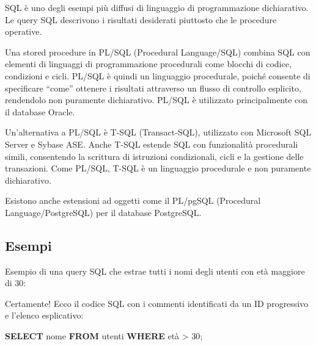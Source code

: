 \documentclass[
  letterpaper,
]{scrbook}
\newenvironment{Shaded}{\begin{snugshade}}{\end{snugshade}}
\newcommand{\DecValTok}[1]{\textcolor[rgb]{0.68,0.00,0.00}{#1}}
\newcommand{\KeywordTok}[1]{\textcolor[rgb]{0.00,0.23,0.31}{\textbf{#1}}}
\newcommand{\NormalTok}[1]{\textcolor[rgb]{0.00,0.23,0.31}{#1}}
\newcommand{\OperatorTok}[1]{\textcolor[rgb]{0.37,0.37,0.37}{#1}}
\newcommand*\circled[1]{\tikz[baseline=(char.base)]{
          \node[shape=circle,draw,inner sep=1pt] (char) {{\scriptsize#1}};}}
\begin{document}
\begin{tcolorbox}[enhanced jigsaw, leftrule=.75mm, arc=.35mm, opacityback=0, rightrule=.15mm, titlerule=0mm, colbacktitle=quarto-callout-note-color!10!white, colback=white, colframe=quarto-callout-note-color-frame, bottomrule=.15mm, toprule=.15mm, bottomtitle=1mm, toptitle=1mm, title=\textcolor{quarto-callout-note-color}{\faInfo}\hspace{0.5em}{Nota}, breakable, coltitle=black, opacitybacktitle=0.6, left=2mm]

SQL è uno degli esempi più diffusi di linguaggio di programmazione
dichiarativo. Le query SQL descrivono i risultati desiderati piuttosto
che le procedure operative.

Una stored procedure in PL/SQL (Procedural Language/SQL) combina SQL con
elementi di linguaggi di programmazione procedurali come blocchi di
codice, condizioni e cicli. PL/SQL è quindi un linguaggio procedurale,
poiché consente di specificare ``come'' ottenere i risultati attraverso
un flusso di controllo esplicito, rendendolo non puramente dichiarativo.
PL/SQL è utilizzato principalmente con il database Oracle.

Un'alternativa a PL/SQL è T-SQL (Transact-SQL), utilizzato con Microsoft
SQL Server e Sybase ASE. Anche T-SQL estende SQL con funzionalità
procedurali simili, consentendo la scrittura di istruzioni condizionali,
cicli e la gestione delle transazioni. Come PL/SQL, T-SQL è un
linguaggio procedurale e non puramente dichiarativo.

Esistono anche estensioni ad oggetti come il PL/pgSQL (Procedural
Language/PostgreSQL) per il database PostgreSQL.

\end{tcolorbox}

\subsection{Esempi}\label{esempi}

Esempio di una query SQL che estrae tutti i nomi degli utenti con età
maggiore di 30:

Certamente! Ecco il codice SQL con i commenti identificati da un ID
progressivo e l'elenco esplicativo:

\label{annotated-cell-15}%
\begin{Shaded}
\begin{Highlighting}[]
\KeywordTok{SELECT}\NormalTok{ nome }\hspace*{\fill}\NormalTok{\circled{1}}
\KeywordTok{FROM}\NormalTok{ utenti }\hspace*{\fill}\NormalTok{\circled{2}}
\KeywordTok{WHERE}\NormalTok{ età }\OperatorTok{\textgreater{}} \DecValTok{30}\NormalTok{; }\hspace*{\fill}\NormalTok{\circled{3}}
\end{Highlighting}
\end{Shaded}
\end{document}
